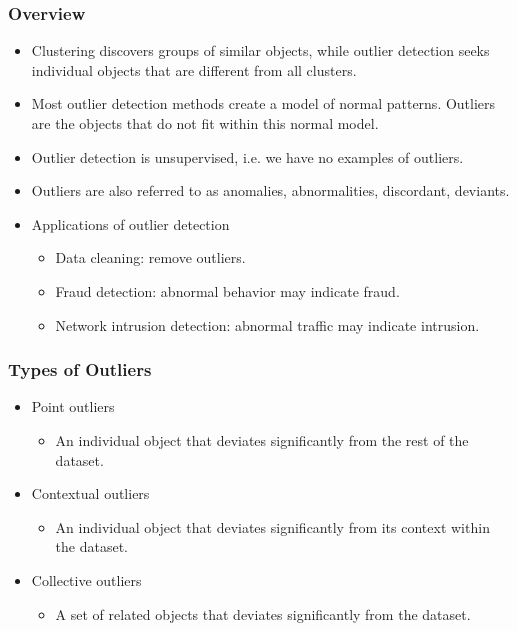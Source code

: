 \documentclass{article}
\begin{document}
\subsubsection{Overview}
\begin{itemize}
  \item Clustering discovers groups of similar objects, while outlier detection seeks individual objects that are different from all clusters.
  \item Most outlier detection methods create a model of normal patterns. Outliers are the objects that do not fit within this normal model.
  \item Outlier detection is unsupervised, i.e. we have no examples of outliers.
  \item Outliers are also referred to as anomalies, abnormalities, discordant, deviants.
  \item Applications of outlier detection
  \begin{itemize}
    \item Data cleaning: remove outliers.
    \item Fraud detection: abnormal behavior may indicate fraud.
    \item Network intrusion detection: abnormal traffic may indicate intrusion.
  \end{itemize}
\end{itemize}

\subsubsection{Types of Outliers}
\begin{itemize}
  \item Point outliers
  \begin{itemize}
    \item An individual object that deviates significantly from the rest of the dataset.
  \end{itemize}

  \item Contextual outliers
  \begin{itemize}
    \item An individual object that deviates significantly from its context within the dataset.
  \end{itemize}

  \item Collective outliers
  \begin{itemize}
    \item A set of related objects that deviates significantly from the dataset.
  \end{itemize}

\end{itemize}
\end{document}

